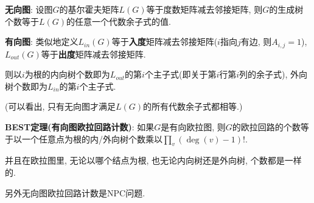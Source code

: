 \textbf{无向图}: 设图$G$的基尔霍夫矩阵$L(G)$等于度数矩阵减去邻接矩阵, 则$G$的生成树个数等于$L(G)$的任意一个代数余子式的值.

\textbf{有向图}: 类似地定义$L_{in}(G)$等于\textbf{入度}矩阵减去邻接矩阵($i$指向$j$有边, 则$A_{i, j} = 1$), $L_{out}(G)$等于\textbf{出度}矩阵减去邻接矩阵.

则以$i$为根的内向树个数即为$L_{out}$的第$i$个主子式(即关于第$i$行第$i$列的余子式), 外向树个数即为$L_{in}$的第$i$个主子式.

(可以看出, 只有无向图才满足$L(G)$的所有代数余子式都相等.)

\textbf{BEST定理(有向图欧拉回路计数)}: 如果$G$是有向欧拉图, 则$G$的欧拉回路的个数等于以一个任意点为根的内/外向树个数乘以$\prod_v (\deg(v) - 1) !$.

并且在欧拉图里, 无论以哪个结点为根, 也无论内向树还是外向树, 个数都是一样的.

另外无向图欧拉回路计数是NPC问题.